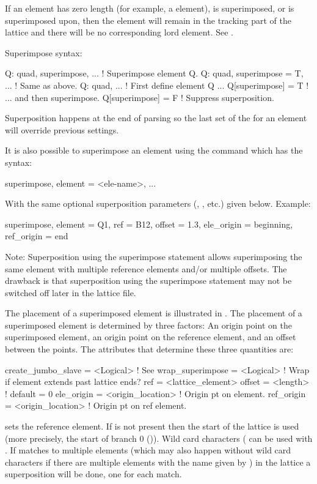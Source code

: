 If an element has zero length (for example, a  element), is superimposed, or is
superimposed upon, then the element will remain in the tracking part of the lattice and there will
be no corresponding lord element. See .
 
Superimpose syntax:
\begin{example}
  Q: quad, superimpose, ...       ! Superimpose element Q.
  Q: quad, superimpose = T, ...   ! Same as above.
  Q: quad, ...                    ! First define element Q ...
  Q[superimpose] = T              !   ... and then superimpose.
  Q[superimpose] = F              ! Suppress superposition.
\end{example}
Superposition happens at the end of parsing so the last set of the  for an element
will override previous settings. 

It is also possible to superimpose an element using the  command which has the
syntax:
\begin{example}
  superimpose, element = <ele-name>, ...
\end{example}
With the same optional superposition parameters (, , etc.) given below.
Example:
\begin{example}
  superimpose, element = Q1, ref = B12, offset = 1.3, 
                               ele_origin = beginning, ref_origin = end
\end{example}
Note: Superposition using the superimpose statement allows superimposing the same element with
multiple reference elements and/or multiple offsets. The drawback is that superposition using the
superimpose statement may not be switched off later in the lattice file.

The placement of a superimposed element is illustrated in . The placement of a
superimposed element is determined by three factors: An origin point on the superimposed element, an
origin point on the reference element, and an offset between the points. The attributes that
determine these three quantities are:
\begin{example}
  create_jumbo_slave = <Logical>     ! See 
  wrap_superimpose   = <Logical>     ! Wrap if element extends past lattice ends?
  ref          = <lattice_element>
  offset       = <length>            ! default = 0
  ele_origin   = <origin_location>   ! Origin pt on element.
  ref_origin   = <origin_location>   ! Origin pt on ref element.
\end{example}
 sets the reference element. If  is not present then the start of the lattice is
used (more precisely, the start of branch 0 ()). Wild card characters
( can be used with . If  matches to multiple elements (which may
also happen without wild card characters if there are multiple elements with the name given by
) in the lattice a superposition will be done, one for each match.

